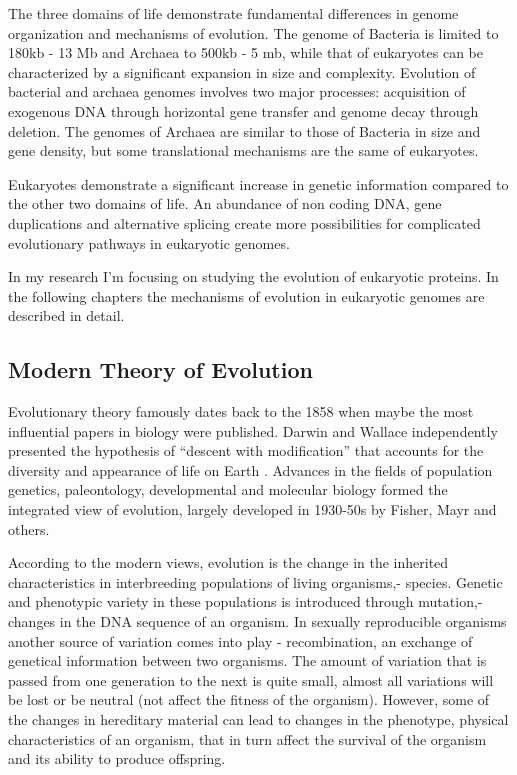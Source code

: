 \documentclass[11pt, a4paper,oneside]{report}
\begin{document}
The three domains of life demonstrate fundamental differences in genome organization and mechanisms of evolution. The genome of Bacteria is limited to 180kb - 13 Mb and Archaea to 500kb - 5 mb\cite{Koonin2008}, while that of eukaryotes can be characterized by a significant expansion in size and complexity\cite{Gregory2007, Parfrey2008}. Evolution of bacterial and archaea genomes involves two major processes: acquisition of exogenous DNA through horizontal gene transfer and genome decay through deletion\cite{Pal2005}. The genomes of Archaea are similar to those of Bacteria in size and gene density, but some translational mechanisms are the same of eukaryotes.

 Eukaryotes demonstrate a significant increase in genetic information compared to the other two domains of life. An abundance of non coding DNA, gene duplications and alternative splicing create more possibilities for complicated evolutionary pathways in eukaryotic genomes.
 
  In my research I'm focusing on studying the evolution of eukaryotic proteins. In the following chapters the mechanisms of evolution in eukaryotic genomes are described in detail.
  
\subsection{Modern Theory of Evolution}
Evolutionary theory famously dates back to the 1858 when maybe the most influential papers in biology were published. 
Darwin and Wallace independently presented the hypothesis of “descent with modification” that accounts for the diversity 
and appearance of life on Earth \cite{Wallace1912}. Advances in the fields of population genetics, paleontology, developmental and 
molecular biology formed the integrated view of evolution, largely developed in 1930-50s by Fisher, Mayr and others\cite{MAYR1963,Grant1980,Kutschera2004}. 

According to the modern views, evolution is the change in the inherited characteristics in interbreeding populations of 
living organisms,- species. Genetic and phenotypic variety in these populations is introduced through mutation,- changes in the DNA sequence of an organism. In sexually reproducible organisms another source of variation comes into play - recombination, an exchange of genetical information between two organisms. The amount of variation that is passed from one generation to the next is quite small, almost all variations will be lost or be neutral (not affect the fitness of the organism). However, some of the changes in hereditary material can lead to changes in the phenotype, physical characteristics of an organism, that in turn affect the survival of the organism and its ability to produce offspring. 
\end{document}
